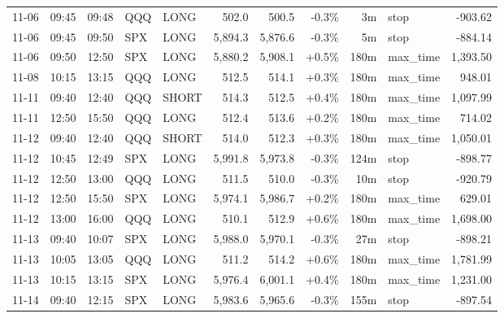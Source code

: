 \documentclass[11pt,a4paper,twoside]{article}
\begin{document}
\begin{center}
\begin{longtable}{>{\color{txtmain}}l l l l l r r r r >{\color{txtmain}}l r}
11-06 & 09:45 & 09:48 & QQQ & LONG & 502.0 & 500.5 & \textcolor{lossred}{-0.3\%} & 3m & stop & \textcolor{lossred}{-903.62} \\
11-06 & 09:45 & 09:50 & SPX & LONG & 5,894.3 & 5,876.6 & \textcolor{lossred}{-0.3\%} & 5m & stop & \textcolor{lossred}{-884.14} \\
11-06 & 09:50 & 12:50 & SPX & LONG & 5,880.2 & 5,908.1 & \textcolor{wingreen}{+0.5\%} & 180m & max\_time & \textcolor{wingreen}{1,393.50} \\
11-08 & 10:15 & 13:15 & QQQ & LONG & 512.5 & 514.1 & \textcolor{wingreen}{+0.3\%} & 180m & max\_time & \textcolor{wingreen}{948.01} \\
11-11 & 09:40 & 12:40 & QQQ & SHORT & 514.3 & 512.5 & \textcolor{wingreen}{+0.4\%} & 180m & max\_time & \textcolor{wingreen}{1,097.99} \\
11-11 & 12:50 & 15:50 & QQQ & LONG & 512.4 & 513.6 & \textcolor{wingreen}{+0.2\%} & 180m & max\_time & \textcolor{wingreen}{714.02} \\
11-12 & 09:40 & 12:40 & QQQ & SHORT & 514.0 & 512.3 & \textcolor{wingreen}{+0.3\%} & 180m & max\_time & \textcolor{wingreen}{1,050.01} \\
11-12 & 10:45 & 12:49 & SPX & LONG & 5,991.8 & 5,973.8 & \textcolor{lossred}{-0.3\%} & 124m & stop & \textcolor{lossred}{-898.77} \\
11-12 & 12:50 & 13:00 & QQQ & LONG & 511.5 & 510.0 & \textcolor{lossred}{-0.3\%} & 10m & stop & \textcolor{lossred}{-920.79} \\
11-12 & 12:50 & 15:50 & SPX & LONG & 5,974.1 & 5,986.7 & \textcolor{wingreen}{+0.2\%} & 180m & max\_time & \textcolor{wingreen}{629.01} \\
11-12 & 13:00 & 16:00 & QQQ & LONG & 510.1 & 512.9 & \textcolor{wingreen}{+0.6\%} & 180m & max\_time & \textcolor{wingreen}{1,698.00} \\
11-13 & 09:40 & 10:07 & SPX & LONG & 5,988.0 & 5,970.1 & \textcolor{lossred}{-0.3\%} & 27m & stop & \textcolor{lossred}{-898.21} \\
11-13 & 10:05 & 13:05 & QQQ & LONG & 511.2 & 514.2 & \textcolor{wingreen}{+0.6\%} & 180m & max\_time & \textcolor{wingreen}{1,781.99} \\
11-13 & 10:15 & 13:15 & SPX & LONG & 5,976.4 & 6,001.1 & \textcolor{wingreen}{+0.4\%} & 180m & max\_time & \textcolor{wingreen}{1,231.00} \\
11-14 & 09:40 & 12:15 & SPX & LONG & 5,983.6 & 5,965.6 & \textcolor{lossred}{-0.3\%} & 155m & stop & \textcolor{lossred}{-897.54} \\

\end{longtable}
\end{center}
\end{document}
